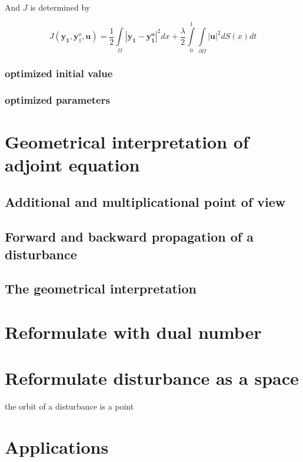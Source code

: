 \documentclass{article}
\begin{document}
And $ J $ is determined by

$$
J(\mathbf{y_1}, \mathbf{y}_1^o, \mathbf{u}) = \frac{1}{2} \int\limits_{\Omega}|\mathbf{y_1} - \mathbf{y_1^o}|^2dx +  \frac{\lambda}{2} \int\limits_{0}^{1}\int\limits_{\partial \Omega} |\mathbf{u}|^2 dS(x) dt
$$

\subsubsection{optimized initial value}

\subsubsection{optimized parameters}

\section{Geometrical interpretation of adjoint equation}

\subsection{Additional and multiplicational point of view}

\subsection{Forward and backward propagation of a disturbance}

\subsection{The geometrical interpretation}


\section{Reformulate with dual number}


\section{Reformulate disturbance as a space}

the orbit of a disturbance is a point

\section{Applications}
\end{document}
